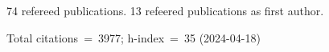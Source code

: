 74 refereed publications. 13 refeered publications as first author.

Total citations~=~3977; h-index~=~35 (2024-04-18)